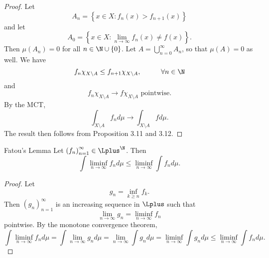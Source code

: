 \documentclass[pmath451]{subfiles}
\begin{document}
    \begin{proof}
        Let
        \begin{equation*}
            A_n = \left\lbrace x\in X: f_n\left( x \right)>f_{n+1}\left( x \right) \right\rbrace
        \end{equation*}
        and let
        \begin{equation*}
            A_0 = \left\lbrace x\in X: \lim_{n\to\infty}f_n\left( x \right)\neq f\left( x \right) \right\rbrace.
        \end{equation*}
        Then $\mu\left( A_n \right) = 0$ for all $n\in\N\cup\left\lbrace 0 \right\rbrace$. Let $A = \bigcup^{\infty}_{n=0} A_n$, so that $\mu\left( A \right) = 0$ as well. We have
        \begin{equation*}
            f_n\chi_{X\setminus A} \leq f_{n+1}\chi_{X\setminus A},\hspace{1cm}\forall n\in\N
        \end{equation*}
        and
        \begin{equation*}
            f_n\chi_{X\setminus A} \to f\chi_{X\setminus A}\text{ pointwise}.
        \end{equation*}
        By the MCT,
        \begin{equation*}
            \int_{X\setminus A}f_nd\mu \to \int_{X\setminus A}fd\mu.
        \end{equation*}
        The result then follows from Proposition 3.11 and 3.12.
    \end{proof}

    \begin{theorem}{Fatou's Lemma}
        Let $\left( f_{n} \right)^{\infty}_{n=1}\in\Lplus^{\N}$. Then
        \begin{equation*}
            \int\liminf_{n\to\infty}f_nd\mu \leq \liminf_{n\to\infty}\int f_nd\mu.
        \end{equation*}
    \end{theorem}

    \begin{proof}
        Let
        \begin{equation*}
            g_n = \inf_{k\geq n}f_k.
        \end{equation*}
        Then $\left( g_{n} \right)^{\infty}_{n=1}$ is an increasing sequence in $\Lplus$ such that
        \begin{equation*}
            \lim_{n\to\infty} g_n = \liminf_{n\to\infty}f_n
        \end{equation*}
        pointwise. By the monotone convergence theorem,
        \begin{equation*}
            \int\liminf_{n\to\infty}f_nd\mu = \int\lim_{n\to\infty}g_nd\mu = \lim_{n\to\infty}\int g_nd\mu = \liminf_{n\to\infty}\int g_nd\mu \leq \liminf_{n\to\infty}\int f_nd\mu.
        \end{equation*}
    \end{proof}
\end{document}
